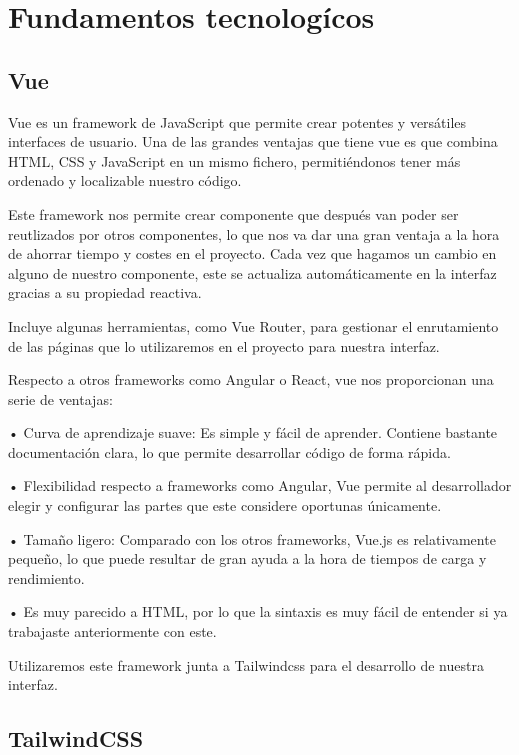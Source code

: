 \chapter{Fundamentos tecnologícos}
\label{chap:Fundamentos tecnologícos}

\section{Vue}

Vue es un framework de JavaScript que permite crear potentes y versátiles interfaces de usuario. Una de las grandes ventajas que tiene vue es que combina HTML, CSS y JavaScript en un mismo fichero, permitiéndonos tener más ordenado y localizable nuestro código. 

Este framework nos permite crear componente que después van poder ser reutlizados por otros componentes, lo que nos va dar una gran ventaja a la hora de ahorrar tiempo y costes en el proyecto.
Cada vez que hagamos un cambio en alguno de nuestro componente, este se actualiza automáticamente en la interfaz gracias a su propiedad reactiva.

Incluye algunas herramientas, como Vue Router, para gestionar el enrutamiento de las páginas que lo utilizaremos en el proyecto para nuestra interfaz.

Respecto a otros frameworks como Angular o React, vue nos proporcionan una serie de ventajas:

• Curva de aprendizaje suave: Es simple y fácil de aprender. Contiene bastante documentación clara, lo que permite desarrollar código de forma rápida.

• Flexibilidad respecto a frameworks como Angular, Vue permite al desarrollador elegir y configurar las partes que este considere oportunas únicamente.

• Tamaño ligero: Comparado con los otros frameworks, Vue.js es relativamente pequeño, lo que puede resultar de gran ayuda a la hora de tiempos de carga y rendimiento.

• Es muy parecido a HTML, por lo que la sintaxis es muy fácil de entender si ya trabajaste anteriormente con este. 


Utilizaremos este framework junta a Tailwindcss para el desarrollo de nuestra interfaz.

\section{TailwindCSS}

